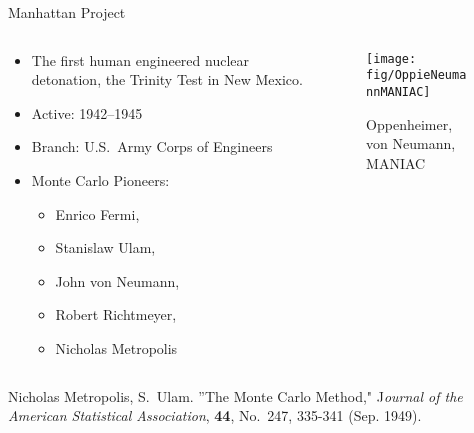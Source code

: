 \documentclass[xcolor=x11names,compress]{beamer}
\renewcommand{\(}{\begin{columns}}
\renewcommand{\)}{\end{columns}}
\newcommand{\<}[1]{\begin{column}{#1}}
\renewcommand{\>}{\end{column}}
\begin{document}
\begin{frame}{Manhattan Project}

\begin{columns}
  \begin{column}{0.5\textwidth}
    \begin{itemize}
    \item The first human engineered nuclear detonation, 
    the Trinity Test in New Mexico.
    \item Active: 1942--1945
    \item Branch: U.S.\ Army Corps of Engineers
    \item Monte Carlo Pioneers:
    \begin{itemize}
      \item Enrico Fermi,
      \item Stanislaw Ulam,
      \item John von Neumann, 
      \item Robert Richtmeyer, 
      \item Nicholas Metropolis
    \end{itemize}
    \end{itemize}
  \end{column}
  \begin{column}{0.5\textwidth}
  	\begin{figure}
  	\begin{center}
  		\texttt{[image: fig/OppieNeumannMANIAC]}
  		\caption{Oppenheimer, von Neumann, MANIAC}
	\end{center}
  	\end{figure}
  \end{column}
\end{columns}

Nicholas Metropolis, S.\ Ulam. ''The Monte Carlo Method," J\textit{ournal of the American Statistical Association}, \textbf{44}, No.\ 247, 335-341 (Sep. 1949).
\end{frame}
\end{document}
